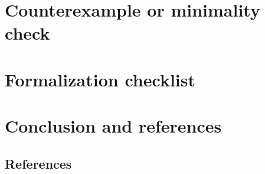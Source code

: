 \documentclass[11pt]{article}
\theoremstyle{definition}
\theoremstyle{plain}
\theoremstyle{remark}
\begin{document}
\section{Counterexample or minimality check}

\section{Formalization checklist}

\section{Conclusion and references}

\subsection*{References}
\end{document}
